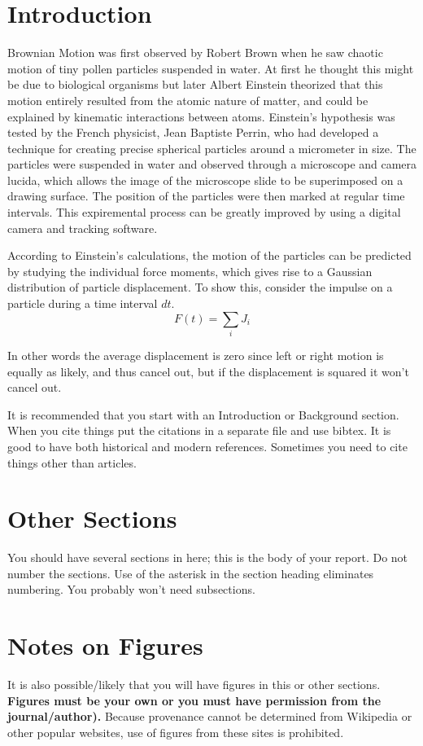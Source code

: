 \documentclass[aps,prb,twocolumn,groupedaddress,nofootinbib,floatfix]{revtex4}
\newcommand{\beq}{\begin{equation}}
\newcommand{\eeq}{\end{equation}}
\begin{document}
\section*{Introduction}
Brownian Motion was first observed by Robert Brown when he saw chaotic motion of tiny pollen particles suspended in water. At first he thought this might be due to biological organisms but later Albert Einstein theorized that this motion entirely resulted from the atomic nature of matter, and could be explained by kinematic interactions between atoms. Einstein's hypothesis was tested by the French physicist, Jean Baptiste Perrin, who had developed a technique for creating precise spherical particles around a micrometer in size. The particles were suspended in water and observed through a microscope and camera lucida, which allows the image of the microscope slide to be superimposed on a drawing surface. The position of the particles were then marked at regular time intervals. This expiremental process can be greatly improved by using a digital camera and tracking software. 

According to Einstein's calculations, the motion of the particles can be predicted by studying the individual force moments, which gives rise to a Gaussian distribution of particle displacement. To show this, consider the impulse on a particle during a time interval $dt$.
\beq
F(t)=\sum_{i} J_i
\eeq 


In other words the average displacement is zero since left or right motion is equally as likely, and thus cancel out, but if the displacement is squared it won't cancel out.    


It is recommended that you start with an Introduction or Background
section.  When you cite things \cite{Foner1} put the citations in a separate file and
use bibtex.   It is good to have both historical and modern references. \cite{Tickle,Basso}
Sometimes you need to cite things other than articles. \cite{UnitsTable}
%
\section*{Other Sections}
You should have several sections in here; this is the body of your report.   Do not number the sections.
Use of the asterisk in the section heading eliminates numbering.   You probably won't need subsections.
%
\section*{Notes on Figures}
It is also possible/likely that you will have figures in this or other
sections.  \textbf{Figures must be your own or you
must have permission from the journal/author).}  Because provenance
cannot be determined from Wikipedia or other popular websites, use of
figures from these sites is prohibited.   
\end{document}
